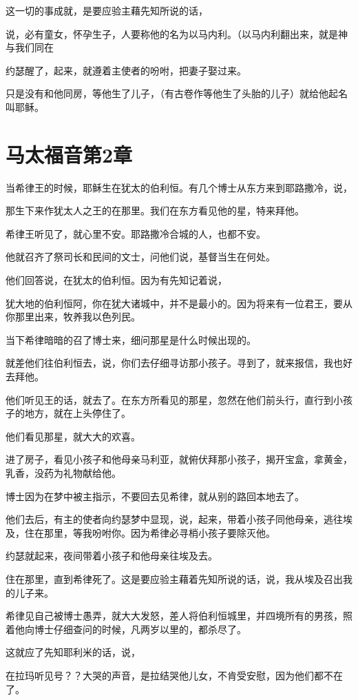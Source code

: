 \documentclass[12pt,oneside]{book}
\begin{document}
这一切的事成就，是要应验主藉先知所说的话，

说，必有童女，怀孕生子，人要称他的名为以马内利。（以马内利翻出来，就是神与我们同在

约瑟醒了，起来，就遵着主使者的吩咐，把妻子娶过来。

只是没有和他同房，等他生了儿子，（有古卷作等他生了头胎的儿子）就给他起名叫耶稣。

\chapter{马太福音第2章}
当希律王的时候，耶稣生在犹太的伯利恒。有几个博士从东方来到耶路撒冷，说，

那生下来作犹太人之王的在那里。我们在东方看见他的星，特来拜他。

希律王听见了，就心里不安。耶路撒冷合城的人，也都不安。

他就召齐了祭司长和民间的文士，问他们说，基督当生在何处。

他们回答说，在犹太的伯利恒。因为有先知记着说，

犹大地的伯利恒阿，你在犹大诸城中，并不是最小的。因为将来有一位君王，要从你那里出来，牧养我以色列民。

当下希律暗暗的召了博士来，细问那星是什么时候出现的。

就差他们往伯利恒去，说，你们去仔细寻访那小孩子。寻到了，就来报信，我也好去拜他。

他们听见王的话，就去了。在东方所看见的那星，忽然在他们前头行，直行到小孩子的地方，就在上头停住了。

他们看见那星，就大大的欢喜。

进了房子，看见小孩子和他母亲马利亚，就俯伏拜那小孩子，揭开宝盒，拿黄金，乳香，没药为礼物献给他。

博士因为在梦中被主指示，不要回去见希律，就从别的路回本地去了。

他们去后，有主的使者向约瑟梦中显现，说，起来，带着小孩子同他母亲，逃往埃及，住在那里，等我吩咐你。因为希律必寻梢小孩子要除灭他。

约瑟就起来，夜间带着小孩子和他母亲往埃及去。

住在那里，直到希律死了。这是要应验主藉着先知所说的话，说，我从埃及召出我的儿子来。

希律见自己被博士愚弄，就大大发怒，差人将伯利恒城里，并四境所有的男孩，照着他向博士仔细查问的时候，凡两岁以里的，都杀尽了。

这就应了先知耶利米的话，说，

在拉玛听见号？？大哭的声音，是拉结哭他儿女，不肯受安慰，因为他们都不在了。
\end{document}
